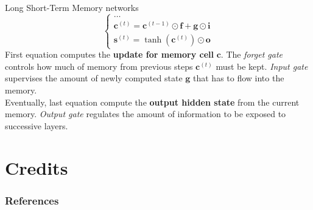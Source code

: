 \documentclass[aspectratio=169]{beamer}
\begin{document}
\begin{frame}{Long Short-Term Memory networks}
\begin{equation}
\begin{cases}
	\dots\\
	\bm{c}^{(t)} = \bm{c}^{(t-1)} \odot \bm{f} + \bm{g} \odot \bm{i}\\
	\bm{s}^{(t)} = \tanh(\bm{c}^{(t)}) \odot \bm{o}
\end{cases}
\end{equation}
First equation computes the \textbf{update for memory cell} $\bm{c}$. The \textit{forget gate} controls how much of memory from previous steps $\bm{c}^{(t)}$ must be kept. \textit{Input gate} supervises the amount of newly computed state $\bm{g}$ that has to flow into the memory.\\
\vspace{0.25cm}
Eventually, last equation compute the \textbf{output hidden state} from the current memory. \textit{Output gate} regulates the amount of information to be exposed to successive layers.
\end{frame}



\section{Credits}



\begin{frame}[t, allowframebreaks]
\frametitle{References}


\end{frame}
\end{document}

